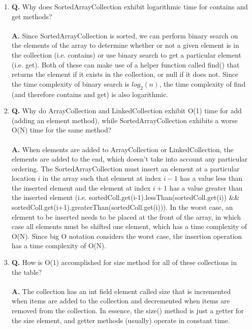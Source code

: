 \documentclass[12pt]{article}
\begin{document}
\begin{enumerate}
    \begin{enumerate}[label=\Alph*]
    \item \textbf{Q.} Why does SortedArrayCollection exhibit logarithmic time for contains and get methods?
    \\\\
     \textbf{A.} Since SortedArrayCollection is sorted, we can perform binary search on the elements of the array to determine whether or not a given element is in the collection (i.e. contains) or use binary search to get a particular element (i.e. get). Both of these can make use of a helper function called find() that returns the element if it exists in the collection, or null if it does not. Since the time complexity of binary search is $log_{2}(n)$, the time complexity of find (and therefore contains and get) is also logarithmic.
     \\
    \item \textbf{Q.} Why do ArrayCollection and LinkedCollection exhibit O(1) time for add (adding an element method), while SortedArrayCollection exhibits a worse O(N) time for the same method?
    \\\\
     \textbf{A.} When elements are added to ArrayCollection or LinkedCollection, the elements are added to the end, which doesn't take into account any particular ordering. The SortedArrayCollection must insert an element at a particular location $i$ in the array such that element at index $i-1$ has a value less than the inserted element and the element at index $i+1$ has a value greater than the inserted element (i.e. sortedColl.get(i-1).lessThan(sortedColl.get(i)) \&\& sortedColl.get(i+1).greaterThan(sortedColl.get(i))). In the worst case, an element to be inserted needs to be placed at the front of the array, in which case all elements must be shifted one element, which has a time complexity of O(N). Since big O notation considers the worst case, the insertion operation has a time complexity of O(N).
     \\
    \item \textbf{Q.} How is O(1) accomplished for size method for all of these collections in the table?
    \\\\
     \textbf{A.} The collection has an int field element called size that is incremented when items are added to the collection and decremented when items are removed from the collection. In essence, the size() method is just a getter for the size element, and getter methods (usually) operate in constant time.

\end{enumerate}
\end{enumerate}
\end{document}
